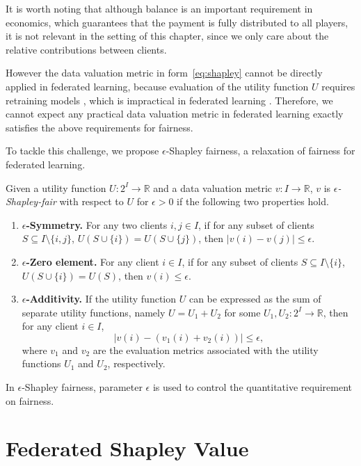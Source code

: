 It is worth noting that although balance is an important requirement in economics, which guarantees that the payment is fully distributed to all players, it is not relevant in the setting of this chapter, since we only care about the relative contributions between clients. 

However the data valuation metric in form~\eqref{eq:shapley} cannot be directly applied in federated learning, because evaluation of the utility function $U$ requires retraining models \citep{ghorbani2019data}, which is impractical in federated learning \citep{wang2020principled}. Therefore, we cannot expect any practical data valuation metric in federated learning exactly satisfies the above requirements for fairness.

To tackle this challenge, we propose $\epsilon$-Shapley fairness, a relaxation of fairness for federated learning.

\begin{definition} \label{def:hfl_fairness}
    Given a utility function $U:2^I \to \mathbb{R}$ and a data valuation metric $v: I \to \mathbb{R}$, $v$ is \emph{$\epsilon$-Shapley-fair} with respect to $U$ for $\epsilon > 0$ if the following two properties hold.
    \begin{enumerate}
    \item \textbf{$\epsilon$-Symmetry.} For any two clients $i, j \in I$, if for any subset of clients $S \subseteq I \setminus \{i,j\}$, $U(S \cup \{i\}) = U(S \cup \{j\})$, then $|v(i) - v(j)| \leq \epsilon$. 
    \item \textbf{$\epsilon$-Zero element.} For any client $i \in I$, if for any subset of clients $S \subseteq I \setminus \{i\}$, $U(S \cup \{i\}) = U(S)$, then $v(i) \leq \epsilon$.
    \item \textbf{$\epsilon$-Additivity.} If the utility function $U$ can be expressed as the sum of separate utility functions, namely $U = U_1 + U_2$ for some $U_1, U_2 : 2^I \to \mathbb{R}$, then for any client $i \in I$, 
    \[|v(i) - (v_1(i)  + v_2(i))| \leq \epsilon,\]
    where $v_1$ and $v_2$ are the evaluation metrics associated with the utility functions $U_1$ and $U_2$, respectively. 
\end{enumerate}
\end{definition}
In $\epsilon$-Shapley fairness, parameter $\epsilon$ is used to control the quantitative requirement on fairness. 

\section{Federated Shapley Value} \label{sec:7-5}

